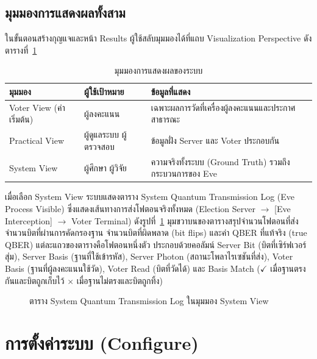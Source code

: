 \subsection{มุมมองการแสดงผลทั้งสาม}
ในขั้นตอนสร้างกุญแจและหน้า Results ผู้ใช้สลับมุมมองได้ที่แถบ Visualization Perspective
ดังตารางที่~\ref{tab:manual-views}

\begin{table}[htbp]
\centering
\begin{tabular}{|l|p{4cm}|p{6cm}|}
\hline
\textbf{มุมมอง} & \textbf{ผู้ใช้เป้าหมาย} & \textbf{ข้อมูลที่แสดง} \\ \hline
Voter View (ค่าเริ่มต้น) & ผู้ลงคะแนน & เฉพาะผลการวัดที่เครื่องผู้ลงคะแนนและประกาศสาธารณะ \\ \hline
Practical View & ผู้ดูแลระบบ ผู้ตรวจสอบ & ข้อมูลฝั่ง Server และ Voter ประกอบกัน \\ \hline
System View & ผู้ศึกษา ผู้วิจัย & ความจริงทั้งระบบ (Ground Truth) รวมถึงกระบวนการของ Eve \\ \hline
\end{tabular}
\caption{มุมมองการแสดงผลของระบบ}
\label{tab:manual-views}
\end{table}

เมื่อเลือก System View ระบบแสดงตาราง System Quantum Transmission Log (Eve Process Visible)
ซึ่งแสดงเส้นทางการส่งโฟตอนจริงทั้งหมด (Election Server $\rightarrow$ [Eve Interception] $\rightarrow$ Voter Terminal)
ดังรูปที่~\ref{fig:manual-system-view}
มุมขวาบนของตารางสรุปจำนวนโฟตอนที่ส่ง จำนวนบิตที่ผ่านการคัดกรองฐาน จำนวนบิตที่ผิดพลาด (bit flips)
และค่า QBER ที่แท้จริง (true QBER)
แต่ละแถวของตารางคือโฟตอนหนึ่งตัว ประกอบด้วยคอลัมน์
Server Bit (บิตที่เซิร์ฟเวอร์สุ่ม), Server Basis (ฐานที่ใช้เข้ารหัส),
Server Photon (สถานะโพลาไรเซชันที่ส่ง), Voter Basis (ฐานที่ผู้ลงคะแนนใช้วัด),
Voter Read (บิตที่วัดได้) และ Basis Match ($\checkmark$ เมื่อฐานตรงกันและบิตถูกเก็บไว้ $\times$ เมื่อฐานไม่ตรงและบิตถูกทิ้ง)

\begin{figure}[htbp]
\centering
{}
\caption{ตาราง System Quantum Transmission Log ในมุมมอง System View}
\label{fig:manual-system-view}
\end{figure}

\section{การตั้งค่าระบบ (Configure)}

